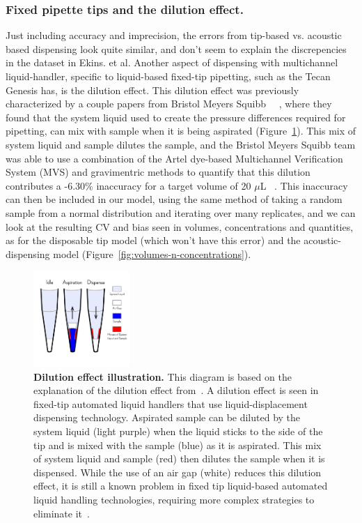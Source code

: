 \documentclass[aps,pre,twocolumn,nofootinbib,superscriptaddress,linenumbers]{revtex4-1}
\begin{document}
\subsubsection*{Fixed pipette tips and the dilution effect.}

Just including accuracy and imprecision, the errors from tip-based vs. acoustic based dispensing look quite similar, and don't seem to explain the discrepencies in the dataset in Ekins. et al. 
Another aspect of dispensing with multichannel liquid-handler, specific to liquid-based fixed-tip pipetting, such as the Tecan Genesis has, is the dilution effect. 
This dilution effect was previously characterized by a couple papers from Bristol Meyers Squibb ~\cite{dong_use_2006}~\cite{gu_dilution_2007}, where they found that the system liquid used to create the pressure differences required for pipetting, can mix with sample when it is being aspirated (Figure~\ref{fig:dilution_effect}). 
This mix of system liquid and sample dilutes the sample, and the Bristol Meyers Squibb team was able to use a combination of the Artel dye-based Multichannel Verification System (MVS) and gravimentric methods to quantify that this dilution contributes a -6.30\% inaccuracy for a target volume of 20 $\mu$L ~\cite{dong_use_2006}.
This inaccuracy can then be included in our model, using the same method of taking a random sample from a normal distribution and iterating over many replicates, and we can look at the resulting CV and bias seen in volumes, concentrations and quantities, as for the disposable tip model (which won't have this error) and the acoustic-dispensing model (Figure~\ref{fig:volumes-n-concentrations}).

\begin{figure}[tb]
    \includegraphics[width=0.325\textwidth]{../figures/dilution_effect.pdf}

  \caption{{\bf Dilution effect illustration.}
  This diagram is based on the explanation of the dilution effect from~\cite{gu_dilution_2007}. 
  A dilution effect is seen in fixed-tip automated liquid handlers that use liquid-displacement dispensing technology. 
  Aspirated sample can be diluted by the system liquid (light purple) when the liquid sticks to the side of the tip and is mixed with the sample (blue) as it is aspirated.
  This mix of system liquid and sample (red) then dilutes the sample when it is dispensed. 
  While the use of an air gap (white) reduces this dilution effect, it is still a known problem in fixed tip liquid-based automated liquid handling technologies, requiring more complex strategies to eliminate it~\cite{gu_dilution_2007}. 
  }
  \label{fig:dilution_effect}
\end{figure}
\end{document}
